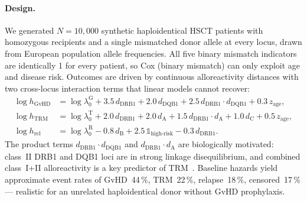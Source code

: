 \documentclass[11pt,a4paper]{article}
\begin{document}
\paragraph{Design.}
We generated $N = 10{,}000$ synthetic haploidentical HSCT patients with homozygous
recipients and a single mismatched donor allele at every locus, drawn from
European population allele frequencies.  All five binary mismatch indicators are
identically 1 for every patient, so Cox (binary mismatch) can only exploit
age and disease risk.  Outcomes are driven by continuous alloreactivity distances
with two cross-locus interaction terms that linear models cannot recover:
\begin{align}
\log h_{\mathrm{GvHD}} &= \log\lambda_0^{\mathrm{G}}
    + 3.5\,d_{\mathrm{DRB1}} + 2.0\,d_{\mathrm{DQB1}}
    + 2.5\,d_{\mathrm{DRB1}}\!\cdot\!d_{\mathrm{DQB1}}
    + 0.3\,z_{\mathrm{age}}, \label{eq:haplo_gvhd}\\
\log h_{\mathrm{TRM}} &= \log\lambda_0^{\mathrm{T}}
    + 2.0\,d_{\mathrm{DRB1}} + 2.0\,d_{\mathrm{A}}
    + 1.5\,d_{\mathrm{DRB1}}\!\cdot\!d_{\mathrm{A}}
    + 1.0\,d_{\mathrm{C}} + 0.5\,z_{\mathrm{age}},\\
\log h_{\mathrm{rel}} &= \log\lambda_0^{\mathrm{R}}
    - 0.8\,d_{\mathrm{B}} + 2.5\,\mathbb{1}_{\mathrm{high\text{-}risk}}
    - 0.3\,d_{\mathrm{DRB1}}.
\end{align}
The product terms $d_{\mathrm{DRB1}}\!\cdot\!d_{\mathrm{DQB1}}$ and
$d_{\mathrm{DRB1}}\!\cdot\!d_{\mathrm{A}}$ are biologically motivated: class~II
DRB1 and DQB1 loci are in strong linkage disequilibrium, and combined
class~I+II alloreactivity is a key predictor of TRM~\citep{fleischhauer2012hla}.
Baseline hazards yield approximate event rates of GvHD~44\,\%, TRM~22\,\%,
relapse~18\,\%, censored~17\,\% — realistic for an unrelated haploidentical
donor without GvHD prophylaxis.
\end{document}
